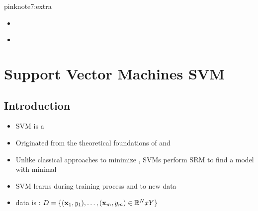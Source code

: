 \documentclass{tron}
\newcommand{\uhref}[2]{\underline{\href{#2}{\color{orange}{#1}}}}
\begin{document}
\begin{note}{pink}{note7:extra}
	\begin{itemize}
		\item \uhref{Measures Summary [Python]}{https://scikit-learn.org/stable/modules/model_ evaluation.html}
		\item \uhref{Confusion Matrix [Web]}{https://www.analyticsvidhya.com/blog/2020/04/confusion-matrix-machine-learning/}
	\end{itemize}
\end{note}


\newpage
\section{Support Vector Machines \Gls{SVM}}
\subsection{Introduction}
\begin{remark}[SVM]{}
	\begin{itemize}
		\item SVM is a 
		\item Originated from the theoretical foundations of  and 
		\item Unlike classical approaches to minimize , SVMs perform SRM to find a model with minimal 
		\item SVM learns during training process and  to new data
		\item data is : $D = \{(\mathbf{x}_1,y_1), \dots , (\mathbf{x}_m,y_m) \in \mathbb{R}^{N} x Y \}$
	\end{itemize}
\end{remark}

\end{document}
